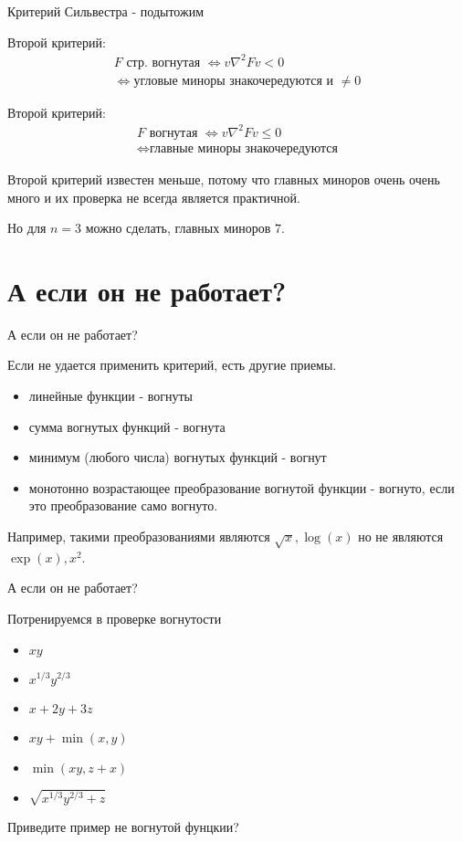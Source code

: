 \documentclass{beamer}
\begin{document}
\begin{frame}{Критерий Сильвестра - подытожим}

Второй критерий:
\begin{gather*} F \text{ стр. вогнутая } \Leftrightarrow v \nabla^2 F v < 0 \\
\Leftrightarrow \text{угловые миноры знакочередуются и }\neq 0\end{gather*}

Второй критерий:
\begin{gather*}F \text{ вогнутая } \Leftrightarrow v \nabla^2 F v \leqslant 0 \\ 
\Leftrightarrow \text{главные миноры знакочередуются}\end{gather*}

Второй критерий известен меньше, потому что главных миноров очень очень много и их проверка не всегда является практичной. 

Но для $n = 3$ можно сделать, главных миноров $7$.

\end{frame}


\section{А если он не работает?}

\begin{frame}{А если он не работает?}

Если не удается применить критерий, есть другие приемы.

\begin{itemize}
  \item линейные функции - вогнуты
  \item сумма вогнутых функций - вогнута
  \item минимум (любого числа) вогнутых функций - вогнут
  \item монотонно возрастающее преобразование вогнутой функции - вогнуто, если это преобразование само вогнуто. 
\end{itemize}

Например, такими преобразованиями являются $\sqrt{x}, \log(x)$ но не являются $\exp(x), x^2$.
 
\end{frame}

\begin{frame}{А если он не работает?}

Потренируемся в проверке вогнутости

\begin{itemize}
  \item $x y$
  \item $x^{1/3} y ^{2/3}$
  \item $x + 2y + 3 z$
  \item $x y + \min(x, y)$
  \item $\min(x y, z + x)$
  \item $\sqrt{x^{1/3} y ^{2/3} + z}$
\end{itemize}

Приведите пример не вогнутой фунцкии?
 
\end{frame}
\end{document}
